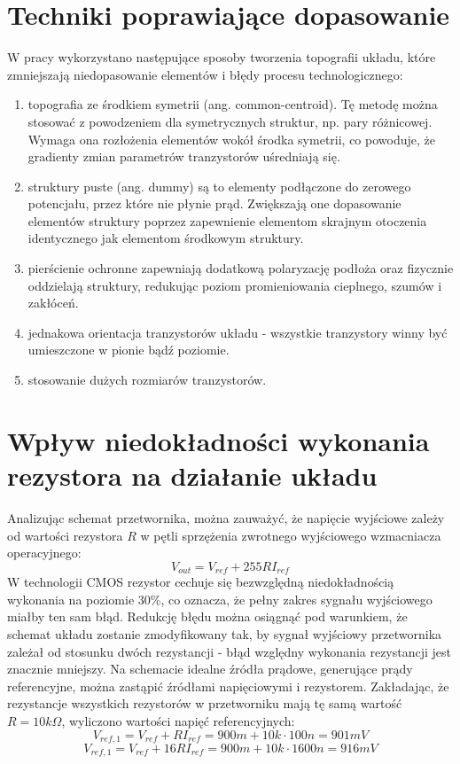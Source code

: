 \documentclass[10pt,a4paper,twoside]{report}
\theoremstyle{definition}
\theoremstyle{definition}
\theoremstyle{definition}
\theoremstyle{definition}
\theoremstyle{definition}
\begin{document}
{{{{{{	\section{Techniki poprawiające dopasowanie}
	{	W pracy wykorzystano następujące sposoby tworzenia topografii układu, które zmniejszają niedopasowanie elementów i błędy procesu technologicznego:
		\begin{enumerate}
			\item topografia ze środkiem symetrii (ang. common-centroid). Tę metodę można stosować z powodzeniem dla symetrycznych struktur, np. pary różnicowej. Wymaga ona rozłożenia elementów wokół środka symetrii, co powoduje, że gradienty zmian parametrów tranzystorów uśredniają się.
			\item struktury puste (ang. dummy) są to elementy podłączone do zerowego potencjału, przez które nie płynie prąd. Zwiększają one dopasowanie elementów struktury poprzez zapewnienie elementom skrajnym otoczenia identycznego jak elementom środkowym struktury.
			\item pierścienie ochronne zapewniają dodatkową polaryzację podłoża oraz fizycznie oddzielają struktury, redukując poziom promieniowania cieplnego, szumów i zakłóceń.
			\item jednakowa orientacja tranzystorów układu - wszystkie tranzystory winny być umieszczone w pionie bądź poziomie.
			\item stosowanie dużych rozmiarów tranzystorów.
		\end{enumerate}

	
	\section{Wpływ niedokładności wykonania rezystora na działanie układu}
	{	Analizując schemat przetwornika, można zauważyć, że napięcie wyjściowe zależy od wartości rezystora $R$ w pętli sprzężenia zwrotnego wyjściowego wzmacniacza operacyjnego:
		\begin{equation}
			V_{out} =  V_{ref} + 255 R I_{ref}
		\end{equation}
		W technologii CMOS rezystor cechuje się bezwzględną niedokładnością wykonania na poziomie 30\%, co oznacza, że pełny zakres sygnału wyjściowego  miałby ten sam błąd. Redukcję błędu można osiągnąć pod warunkiem, że schemat układu zostanie zmodyfikowany tak, by sygnał wyjściowy przetwornika zależał od stosunku dwóch rezystancji - błąd względny wykonania rezystancji jest znacznie mniejszy. 
		Na schemacie idealne źródła prądowe, generujące prądy referencyjne, można zastąpić źródłami napięciowymi i rezystorem. Zakładając, że rezystancje wszystkich rezystorów w przetworniku mają tę samą wartość $R=10k \Omega$, wyliczono wartości napięć referencyjnych:
		\begin{equation}
			V_{ref,1} = V_{ref} + RI_{ref} =900m +  10k \cdot 100n = 901mV
		\end{equation}
		\begin{equation}
			V_{ref,1} = V_{ref} + 16RI_{ref} = 900m + 10k \cdot 1600n = 916mV
		\end{equation}		
		}
}}}}}}}
\end{document}
